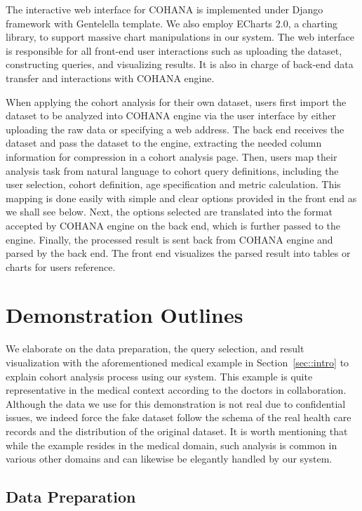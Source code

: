 The interactive web interface for COHANA is implemented under Django\cite{django} framework with Gentelella\cite{gentelella} template. We also employ ECharts 2.0\cite{echarts}, a charting library, to support massive chart manipulations in our system. 
The web interface is responsible for all front-end user interactions such as uploading the dataset, constructing queries, and visualizing results. 
It is also in charge of back-end data transfer and interactions with COHANA engine. 

When applying the cohort analysis for their own dataset, users first import the dataset to be analyzed into COHANA engine via the user interface by either uploading the raw data or specifying a web address.
The back end receives the dataset and pass the dataset to the engine, extracting the needed column information for compression in a cohort analysis page. 
Then, users map their analysis task from natural language to cohort query definitions, including the user selection, cohort definition, age specification and metric calculation.
This mapping is done easily with simple and clear options provided in the front end as we shall see below.
Next, the options selected are translated into the format accepted by COHANA engine on the back end, which is further passed to the engine. 
Finally, the processed result is sent back from COHANA engine and parsed by the back end. The front end visualizes the parsed result into tables or charts for users reference.

\section{Demonstration Outlines}

We elaborate on the data preparation, the query selection, and result visualization with the aforementioned medical example in Section~\ref{sec::intro} to explain cohort analysis process using our system. This example is quite representative in the medical context according to the doctors in collaboration.
Although the data we use for this demonstration is not real due to confidential issues, we indeed force the fake dataset follow the schema of the real health care records and the distribution of the original dataset.
It is worth mentioning that while the example resides in the medical domain, such analysis is common in various other domains and can likewise be elegantly handled by our system.

\subsection{Data Preparation}

